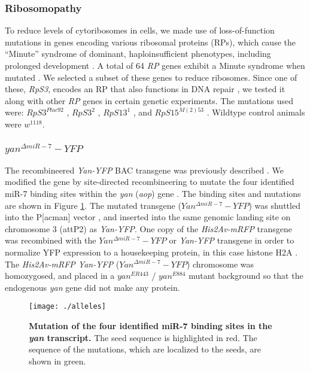 \subsubsection{Ribosomopathy}
\label{appendix:supp:metabolism:exp:ribosomopathy}

To reduce levels of cytoribosomes in cells, we made use of loss-of-function mutations in genes encoding various ribosomal proteins (RPs), which cause the ``Minute'' syndrome of dominant, haploinsufficient phenotypes, including prolonged development \cite{Sæbøe-Larssen1998}. A total of 64 \textit{RP} genes exhibit a Minute syndrome when mutated \cite{Marygold2007}. We selected a subset of these genes to reduce ribosomes. Since one of these, \textit{RpS3}, encodes an RP that also functions in DNA repair \cite{Graifer2014}, we tested it along with other \textit{RP} genes in certain genetic experiments. The mutations used were: $RpS3^{Plac92}$ \cite{Sæbøe-Larssen1998}, $RpS3^{2}$ \cite{Ferrus1975}, $RpS13^{1}$ \cite{Sæbøe-Larssen1998}, and $RpS15^{M(2)53}$ \cite{Golic1996}. Wildtype control animals were $w^{1118}$.

\subsubsection{$yan^{\Delta miR-7}-YFP$}
\label{appendix:supp:metabolism:exp:yan_delta}

The recombineered \textit{Yan-YFP} BAC transgene was previously described \cite{Webber2013}. We modified the gene by site-directed recombineering to mutate the four identified miR-7 binding sites within the \textit{yan} (\textit{aop}) gene \cite{Li2005}. The binding sites and mutations are shown in Figure \ref{fig:metabolism:methods:alleles}. The mutated transgene ($Yan^{\Delta miR-7}-YFP$) was shuttled into the P{[}acman{]} vector \cite{Venken2006}, and inserted into the same genomic landing site on chromosome 3 (attP2) as \textit{Yan-YFP}. One copy of the \textit{His2Av-mRFP} transgene was recombined with the $Yan^{\Delta miR-7}-YFP$ or \textit{Yan-YFP} transgene in order to normalize YFP expression to a housekeeping protein, in this case histone H2A \cite{Pelaez2015}. The \textit{His2Av-mRFP Yan-YFP} ($Yan^{\Delta miR-7}-YFP$) chromosome was homozygosed, and placed in a $yan^{ER443}$ / $yan^{E884}$ mutant background so that the endogenous \textit{yan} gene did not make any protein.

\begin{figure}[h!]
\centering
\captionsetup{width=.5\linewidth}
\texttt{[image: ./alleles]}
\caption[Mutation of the four identified miR-7 binding sites in the \textit{yan} transcript.]{\textbf{Mutation of the four identified miR-7 binding sites in the \textit{yan} transcript.} The seed sequence is highlighted in red. The sequence of the mutations, which are localized to the seeds, are shown in green.}
\label{fig:metabolism:methods:alleles}
\end{figure}

